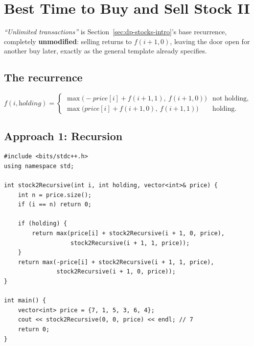 \section{Best Time to Buy and Sell Stock II}
\label{sec:dp-stock-2}


\begin{patternbox}
\emph{``Unlimited transactions''} is Section~\ref{sec:dp-stocks-intro}'s
base recurrence, completely \textbf{unmodified}: selling returns to
$f(i{+}1, 0)$, leaving the door open for another buy later, exactly as
the general template already specifies.
\end{patternbox}

\subsection*{The recurrence}

\[
  f(i, \textit{holding}) =
  \begin{cases}
    \max\big(-\textit{price}[i] + f(i{+}1, 1),\ f(i{+}1, 0)\big) &
    \text{not holding}, \\
    \max\big(\textit{price}[i] + f(i{+}1, 0),\ f(i{+}1, 1)\big) &
    \text{holding.}
  \end{cases}
\]

\subsection*{Approach 1: Recursion}

\begin{lstlisting}
#include <bits/stdc++.h>
using namespace std;

int stock2Recursive(int i, int holding, vector<int>& price) {
    int n = price.size();
    if (i == n) return 0;

    if (holding) {
        return max(price[i] + stock2Recursive(i + 1, 0, price),
                   stock2Recursive(i + 1, 1, price));
    }
    return max(-price[i] + stock2Recursive(i + 1, 1, price),
               stock2Recursive(i + 1, 0, price));
}

int main() {
    vector<int> price = {7, 1, 5, 3, 6, 4};
    cout << stock2Recursive(0, 0, price) << endl; // 7
    return 0;
}
\end{lstlisting}

